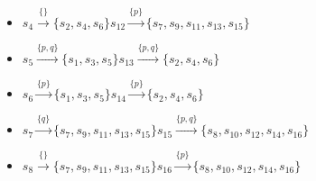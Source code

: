 \documentclass{article}
\begin{document}
\begin{enumerate}
\begin{itemize}
        \item[] $s_{4}\stackrel{\{\}}{\longrightarrow}\{s_{2},s_{4},s_{6}\}$\hspace{2.5cm}$s_{12}\stackrel{\{p\}}{\longrightarrow}\{s_{7},s_{9},s_{11},s_{13},s_{15}\}$
        \item[] $s_{5}\stackrel{\{p,q\}}{\longrightarrow}\{s_{1},s_{3},s_{5}\}$\hspace{2.4cm}$s_{13}\stackrel{\{p,q\}}{\longrightarrow}\{s_{2},s_{4},s_{6}\}$
        \item[] $s_{6}\stackrel{\{p\}}{\longrightarrow}\{s_{1},s_{3},s_{5}\}$\hspace{2.5cm}$s_{14}\stackrel{\{p\}}{\longrightarrow}\{s_{2},s_{4},s_{6}\}$ 
        \item[] $s_{7}\stackrel{\{q\}}{\longrightarrow}\{s_{7},s_{9},s_{11},s_{13},s_{15}\}$\hspace{1.1cm}$s_{15}\stackrel{\{p,q\}}{\longrightarrow}\{s_{8},s_{10},s_{12},s_{14},s_{16}\}$
        \item[] $s_{8}\stackrel{\{\}}{\longrightarrow}\{s_{7},s_{9},s_{11},s_{13},s_{15}\}$\hspace{1.1cm}$s_{16}\stackrel{\{p\}}{\longrightarrow}\{s_{8},s_{10},s_{12},s_{14},s_{16}\}$
    \end{itemize}
\end{enumerate}
\end{document}
